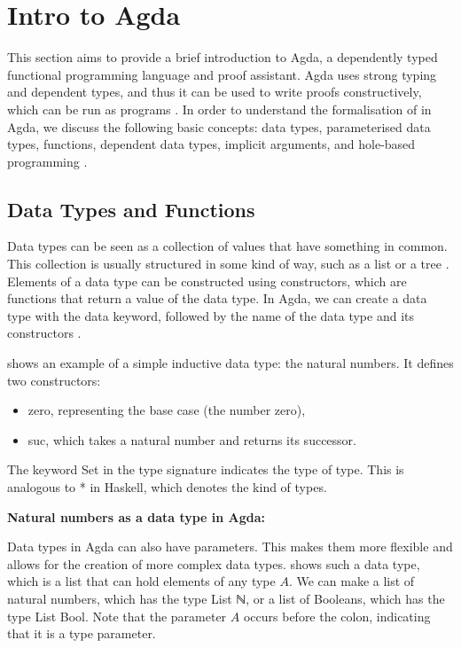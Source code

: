 \section{Intro to Agda}

This section aims to provide a brief introduction to Agda, a dependently typed functional programming language and proof assistant. 
Agda uses strong typing and dependent types, and thus it can be used to write proofs constructively, which can be run as programs \cite{Norell2007}.
In order to understand the formalisation of \lab in Agda, we discuss the following basic concepts: 
data types, parameterised data types, functions, dependent data types, implicit arguments, and hole-based programming \cite{AgdaDocs}.

\subsection{Data Types and Functions}
Data types can be seen as a collection of values that have something in common.
This collection is usually structured in some kind of way, such as a list or a tree \cite{Norell2007}.
Elements of a data type can be constructed using constructors, which are functions that return a value of the data type.
In Agda, we can create a data type with the \textsf{data} keyword, followed by the name of the data type and its constructors \cite{AgdaDocs}.

 shows an example of a simple inductive data type: the natural numbers. It defines two constructors:
\begin{itemize}
  \item \textsf{zero}, representing the base case (the number zero),
  \item \textsf{suc}, which takes a natural number and returns its successor.
\end{itemize}

The keyword \textsf{Set} in the type signature indicates the type of type. This is analogous to \textsf{*} in Haskell, which denotes the kind of types.

\begin{example}
  \label{ex:agda-data-type}
  \textbf{Natural numbers as a data type in Agda:}
  
\end{example}
Data types in Agda can also have parameters. 
This makes them more flexible and allows for the creation of more complex data types.
 shows such a data type, which is a list that can hold elements of any type \(A\).
We can make a list of natural numbers, which has the type \textsf{List ℕ}, or a list of Booleans, which has the type \textsf{List Bool}.
Note that the parameter $A$ occurs before the colon, indicating that it is a type parameter.


